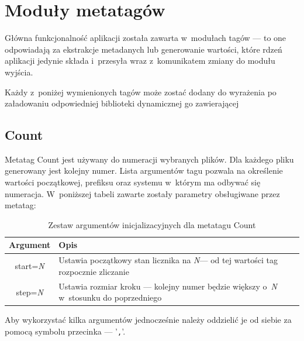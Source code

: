 \section{Moduły metatagów}
Główna funkcjonalność aplikacji została zawarta w~modułach tagów --- to one odpowiadają za ekstrakcje metadanych lub generowanie wartości, które rdzeń aplikacji jedynie składa i~przesyła wraz z~komunikatem zmiany do modułu wyjścia.
\par
Każdy z~poniżej wymienionych tagów może zostać dodany do wyrażenia po załadowaniu odpowiedniej biblioteki dynamicznej go zawierającej

\subsection{Count}
Metatag Count jest używany do numeracji wybranych plików.
Dla każdego pliku generowany jest kolejny numer. Lista argumentów tagu pozwala na określenie wartości początkowej, prefiksu oraz systemu w~którym ma odbywać się numeracja.
 W~poniższej tabeli zawarte zostały parametry obsługiwane przez metatag:
\begin{table}[h]
\begin{center}
\begin{tabular}{| c | p{13cm} |}
\hline
\textbf{Argument} & \textbf{Opis} \\
\hline
start=\textit{N} & Ustawia początkowy stan licznika na \textit{N}--- od tej wartości tag rozpocznie zliczanie \\
step=\textit{N} & Ustawia rozmiar kroku --- kolejny numer będzie większy o~\textit{N} w~stosunku do poprzedniego \\
\hline
\end{tabular} \end{center}
\caption{Zestaw argumentów inicjalizacyjnych dla metatagu Count}
\end{table}

Aby wykorzystać kilka argumentów jednocześnie należy oddzielić je od siebie za pomocą symbolu przecinka --- '\texttt{,}'.

